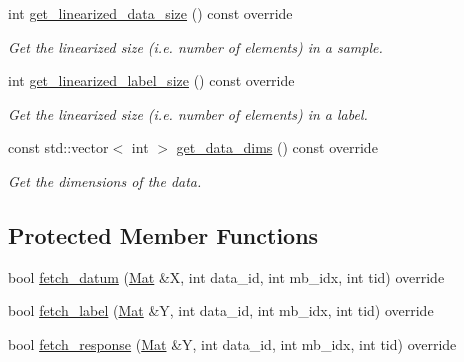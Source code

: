 \begin{DoxyCompactItemize}
int \hyperlink{classlbann_1_1numpy__reader_a527f5dd6da76da189b3c4c72a4b129b3}{get\+\_\+linearized\+\_\+data\+\_\+size} () const override
\begin{DoxyCompactList}\small\item\em Get the linearized size (i.\+e. number of elements) in a sample. \end{DoxyCompactList}\item 
int \hyperlink{classlbann_1_1numpy__reader_aea3fe4402409e2bce9b5892c30779a20}{get\+\_\+linearized\+\_\+label\+\_\+size} () const override
\begin{DoxyCompactList}\small\item\em Get the linearized size (i.\+e. number of elements) in a label. \end{DoxyCompactList}\item 
const std\+::vector$<$ int $>$ \hyperlink{classlbann_1_1numpy__reader_aad4adc242e92334d016127cedc66fc70}{get\+\_\+data\+\_\+dims} () const override
\begin{DoxyCompactList}\small\item\em Get the dimensions of the data. \end{DoxyCompactList}\end{DoxyCompactItemize}
\subsection*{Protected Member Functions}
\begin{DoxyCompactItemize}
\item 
bool \hyperlink{classlbann_1_1numpy__reader_ab08dc207eaae7c7f5a70e602da3c1be0}{fetch\+\_\+datum} (\hyperlink{base_8hpp_a68f11fdc31b62516cb310831bbe54d73}{Mat} \&X, int data\+\_\+id, int mb\+\_\+idx, int tid) override
\item 
bool \hyperlink{classlbann_1_1numpy__reader_a67691517fc4da98ca95dfc934e847067}{fetch\+\_\+label} (\hyperlink{base_8hpp_a68f11fdc31b62516cb310831bbe54d73}{Mat} \&Y, int data\+\_\+id, int mb\+\_\+idx, int tid) override
\item 
bool \hyperlink{classlbann_1_1numpy__reader_ad7c3a680426ffcf467d74ba3a5e6eb20}{fetch\+\_\+response} (\hyperlink{base_8hpp_a68f11fdc31b62516cb310831bbe54d73}{Mat} \&Y, int data\+\_\+id, int mb\+\_\+idx, int tid) override
\end{DoxyCompactItemize}
